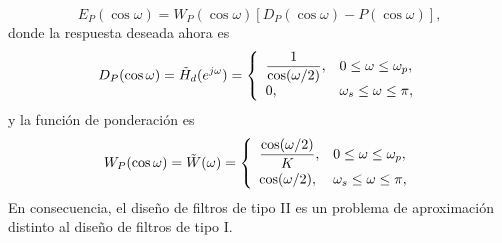 \documentclass[a4paper]{report}
\begin{document}
\[
 E_P(\cos\omega)=W_P(\cos\omega)[D_P(\cos\omega)-P(\cos\omega)],
\]
donde la respuesta deseada ahora es
\[
 D_P(\cos\omega)=\tilde{H}_d(e^{j\omega})=
 \left\{ 
 \begin{array}{ll}
  \dfrac{1}{\cos(\omega/2)}, & 0\leq \omega\leq\omega_p,\\[\medskipamount]
  0, & \omega_s\leq \omega\leq\pi,
 \end{array}
 \right. 
\]
y la función de ponderación es
\[
 W_P(\cos\omega)=\tilde{W}(\omega)=
 \left\{ 
 \begin{array}{ll}
  \dfrac{\cos(\omega/2)}{K}, & 0\leq \omega\leq\omega_p,\\[\medskipamount]
  \cos(\omega/2), & \omega_s\leq \omega\leq\pi,
 \end{array}
 \right. 
\]
En consecuencia, el diseño de filtros de tipo II es un problema de aproximación distinto al diseño de filtros de tipo I.
\end{document}
